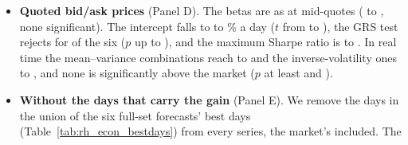 \begin{itemize}
\begin{itemize}
    the risk at the cap. The gain over the market is significant at the 5\% level for none of the six
    (\citet{LedoitWolf2008} $p$ from \rhebRtMvPFullMin{} to \rhebRtMvPFullMax; with the mean of the $\SR_y$,
    \rhebRtMvDSixFullMin{} to \rhebRtMvDSixFullMax{} and bootstrap $p$ from \rhebRtMvDSixPFullMin{} to
    \rhebRtMvDSixPFullMax).
  \item Inverse-volatility weights over the trailing \rhebNTrail{} days, which estimate no means and split the risk
    equally (a median of at most \rhebRtIvWsFullMax\% of capital in premium), reach \rhebRtIvFullMin{} to
    \rhebRtIvFullMax; the gain is significant for none of the six (\citet{LedoitWolf2008} $p$ from
    \rhebRtIvPFullMin{} to \rhebRtIvPFullMax; with the mean of the $\SR_y$, for \rhebRtIvDSixSigFullWord{} under the
    bootstrap).
  \item With the short straddle the two rules reach \rhebRtMvShort{} and \rhebRtIvShort.
  \end{itemize}
\item \textbf{Quoted bid/ask prices} (Panel D). The betas are as at mid-quotes (\rhebBetaFullXMin{} to
  \rhebBetaFullXMax, none significant). The intercept falls to \rhebAlphaFullXMin{} to \rhebAlphaFullXMax\% a day ($t$
  from \rhebAlphaTFullXMin{} to \rhebAlphaTFullXMax), the GRS test rejects for \rhebGrsSigFullXWord{} of the six ($p$
  up to \rhebGrsPFullXMax), and the maximum Sharpe ratio is \rhebSRmaxFullXMin{} to \rhebSRmaxFullXMax. In real time
  the mean--variance combinations reach \rhebRtMvFullXMin{} to \rhebRtMvFullXMax{} and the inverse-volatility ones
  \rhebRtIvFullXMin{} to \rhebRtIvFullXMax, and none is significantly above the market ($p$ at least
  \rhebRtMvPFullXMin{} and \rhebRtIvPFullXMin).
\item \textbf{Without the days that carry the gain} (Panel E). We remove the \rhebNBest{} days in the union of the six
  full-set forecasts' best days (Table~\ref{tab:rh_econ_bestdays}) from every series, the market's included. The

\end{itemize}
